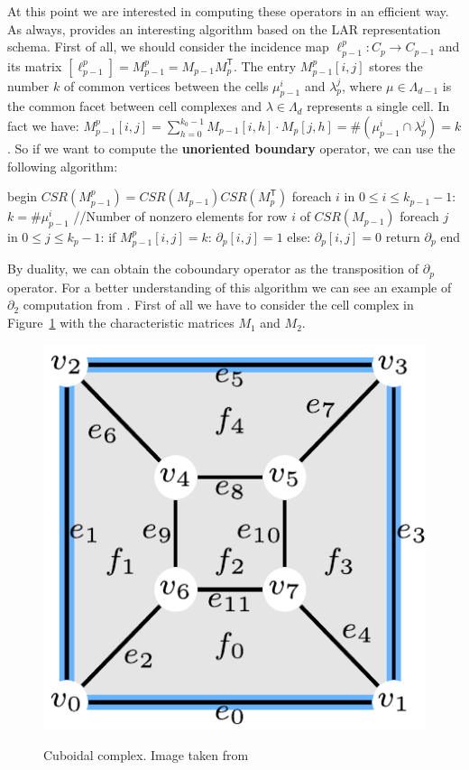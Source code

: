 At this point we are interested in computing these operators in an efficient way. As always, \cite{DiCarlo} provides an interesting algorithm based on the LAR representation schema. First of all, we should consider the incidence map $\ell_{p-1}^{p} \colon C_{p} \rightarrow C_{p-1}$ and its matrix $[\ell_{p-1}^{p}] = M^{p}_{p-1} = M_{p-1}M^{\mathsf{T}}_{p}$. The entry $M_{p-1}^{p}[i,j]$ stores the number $k$ of common vertices between the cells $\mu_{p-1}^{i}$ and $\lambda_{p}^{j}$, where $\mu \in \Lambda_{d-1}$ is the common facet between cell complexes and $\lambda \in \Lambda_{d}$ represents a single cell. In fact we have: $M^{p}_{p-1}[i,j] = \displaystyle\sum_{h=0}^{k_{0}-1} M_{p-1}[i,h] \cdot M_{p}[j,h] = \# (\mu_{p-1}^{i} \cap \lambda_{p}^{j}) = k$. So if we want to compute the \textbf{unoriented boundary} operator, we can use the following algorithm:

\begin{pseudo}[caption={Unoriented boundary algorithm}, label={lst:Boundary}]
begin
 $CSR(M_{p-1}^{p}) = CSR(M_{p-1})CSR(M_{p}^{\mathsf{T}})$
 foreach $i$ in $0 \leq i \leq k_{p-1} - 1$:
   $k = \#\mu_{p-1}^{i}$ //Number of nonzero elements for row $i$ of $CSR(M_{p-1})$
   foreach $j$ in $0 \leq j \leq k_{p} - 1$:
     if $M^{p}_{p-1}[i,j] = k$:
       $\partial_{p}[i, j] = 1$
     else:
       $\partial_{p}[i, j] = 0$
 return $\partial_{p}$
end       
\end{pseudo}

By duality, we can obtain the coboundary operator as the transposition of $\partial_{p}$ operator. For a better understanding of this algorithm we can see an example of $\partial_{2}$ computation from \cite{DiCarlo}. First of all we have to consider the cell complex in Figure~\ref{fig:boundaryExample} with the characteristic matrices $M_1$ and $M_2$.

\begin{figure}[htb] %
   \centering
   \includegraphics[width=0.35\linewidth]{images/boundaryExample.png}\\
   \caption[Cuboidal complex]{Cuboidal complex. Image taken from \cite{DiCarlo}}
   \label{fig:boundaryExample}
\end{figure}

